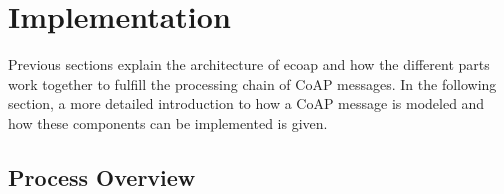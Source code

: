 



\section{Implementation} \label{implementation}

Previous sections explain the architecture of ecoap and how the different parts work together to fulfill the processing chain of CoAP messages. In the following section, a more detailed introduction to how a CoAP message is modeled and how these components can be implemented is given.

\subsection{Process Overview}

